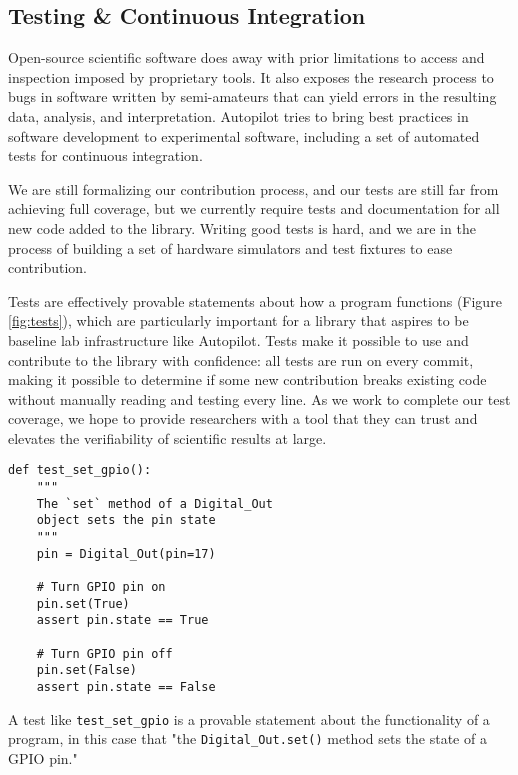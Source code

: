 \subsection{Testing \& Continuous Integration}

Open-source scientific software does away with prior limitations to access and inspection imposed by proprietary tools. It also exposes the research process to bugs in software written by semi-amateurs that can yield errors in the resulting data, analysis, and interpretation\citep{soergelRampantSoftwareErrors2015,eklundClusterFailureWhy2016a,bhandarineupaneCharacterizationLeptazolinesPolar2019,millerScientistNightmareSoftware2006}. Autopilot tries to bring best practices in software development to experimental software, including a set of automated tests for continuous integration. 

We are still formalizing our contribution process, and our tests are still far from achieving full coverage, but we currently require tests and documentation for all new code added to the library. Writing good tests is hard, and we are in the process of building a set of hardware simulators and test fixtures to ease contribution.  

Tests are effectively provable statements about how a program functions (Figure \ref{fig:tests}), which are particularly important for a library that aspires to be baseline lab infrastructure like Autopilot. Tests make it possible to use and contribute to the library with confidence: all tests are run on every commit, making it possible to determine if some new contribution breaks existing code without manually reading and testing every line. As we work to complete our test coverage, we hope to provide researchers with a tool that they can trust and elevates the verifiability of scientific results at large.

\begin{marginfigure}[-7cm]
\begin{verbatim}
def test_set_gpio():
    """
    The `set` method of a Digital_Out
    object sets the pin state
    """
    pin = Digital_Out(pin=17)

    # Turn GPIO pin on
    pin.set(True)
    assert pin.state == True

    # Turn GPIO pin off
    pin.set(False)
    assert pin.state == False
\end{verbatim}
\caption{A test like \texttt{test\_set\_gpio} is a provable statement about the functionality of a program, in this case that "the \texttt{Digital\_Out.set()} method sets the state of a GPIO pin."}
\label{fig:tests}
\end{marginfigure}


